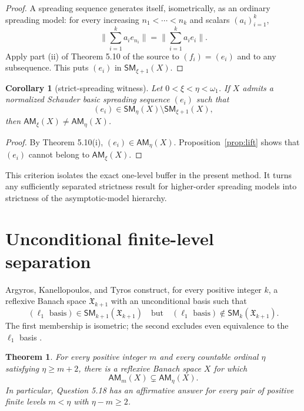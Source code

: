 \documentclass[11pt]{article}
\newtheorem{theorem}{Theorem}
\newtheorem{corollary}{Corollary}
\newcommand{\AM}{\mathsf{AM}}
\newcommand{\SM}{\mathsf{SM}}
\begin{document}
\begin{proof}
A spreading sequence generates itself, isometrically, as an ordinary spreading model: for every increasing $n_1<\cdots<n_k$ and scalars $(a_i)_{i=1}^k$,
\[
 \Big\|\sum_{i=1}^k a_i e_{n_i}\Big\|
 =\Big\|\sum_{i=1}^k a_i e_i\Big\|.
\]
Apply part (ii) of Theorem 5.10 of the source to $(f_i)=(e_i)$ and to any subsequence.  This puts $(e_i)$ in $\SM_{\xi+1}(X)$.
\end{proof}

\begin{corollary}[strict-spreading witness]\label{cor:criterion}
Let $0<\xi<\eta<\omega_1$.  If $X$ admits a normalized Schauder basic spreading sequence $(e_i)$ such that
\[
 (e_i)\in\SM_\eta(X)\setminus\SM_{\xi+1}(X),
\]
then $\AM_\xi(X)\neq\AM_\eta(X)$.
\end{corollary}

\begin{proof}
By Theorem 5.10(i), $(e_i)\in\AM_\eta(X)$.  Proposition~\ref{prop:lift} shows that $(e_i)$ cannot belong to $\AM_\xi(X)$.
\end{proof}

This criterion isolates the exact one-level buffer in the present method.  It turns any sufficiently separated strictness result for higher-order spreading models into strictness of the asymptotic-model hierarchy.

\section*{Unconditional finite-level separation}
Argyros, Kanellopoulos, and Tyros construct, for every positive integer $k$, a reflexive Banach space $\mathfrak X_{k+1}$ with an unconditional basis such that
\begin{equation}\label{eq:AKT}
 (\ell_1\text{ basis})\in\SM_{k+1}(\mathfrak X_{k+1})
 \quad\text{but}\quad
 (\ell_1\text{ basis})\notin\SM_k(\mathfrak X_{k+1}).
\end{equation}
The first membership is isometric; the second excludes even equivalence to the $\ell_1$ basis \cite[Section 12]{AKT}.

\begin{theorem}\label{thm:finite}
For every positive integer $m$ and every countable ordinal $\eta$ satisfying $\eta\geq m+2$, there is a reflexive Banach space $X$ for which
\[
 \AM_m(X)\subsetneq\AM_\eta(X).
\]
In particular, Question 5.18 has an affirmative answer for every pair of positive finite levels $m<\eta$ with $\eta-m\geq2$.
\end{theorem}
\end{document}
